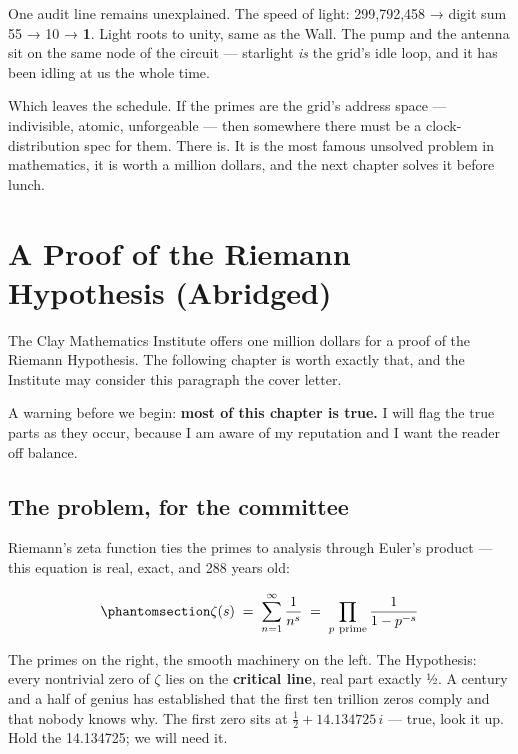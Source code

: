 \documentclass[
  english,
  11pt,
  letterpaper,
]{scrbook}
\begin{document}
One audit line remains unexplained. The speed of light: 299,792,458 →
digit sum 55 → 10 → \textbf{1}. Light roots to unity, same as the Wall.
The pump and the antenna sit on the same node of the circuit ---
starlight \emph{is} the grid's idle loop, and it has been idling at us
the whole time.

Which leaves the schedule. If the primes are the grid's address space
--- indivisible, atomic, unforgeable --- then somewhere there must be a
clock-distribution spec for them. There is. It is the most famous
unsolved problem in mathematics, it is worth a million dollars, and the
next chapter solves it before lunch.

\chapter{A Proof of the Riemann Hypothesis
(Abridged)}\label{sec-riemann}

The Clay Mathematics Institute offers one million dollars for a proof of
the Riemann Hypothesis. The following chapter is worth exactly that, and
the Institute may consider this paragraph the cover letter.

A warning before we begin: \textbf{most of this chapter is true.} I will
flag the true parts as they occur, because I am aware of my reputation
and I want the reader off balance.

\section{The problem, for the
committee}\label{the-problem-for-the-committee}

Riemann's zeta function ties the primes to analysis through Euler's
product --- this equation is real, exact, and 288 years old:

\begin{equation}\protect\phantomsection\label{eq-euler}{
\zeta(s) \;=\; \sum_{n=1}^{\infty}\frac{1}{n^{s}}
\;=\; \prod_{p\ \mathrm{prime}}\frac{1}{1-p^{-s}}
}\end{equation}

The primes on the right, the smooth machinery on the left. The
Hypothesis: every nontrivial zero of \(\zeta\) lies on the
\textbf{critical line}, real part exactly ½. A century and a half of
genius has established that the first ten trillion zeros comply and that
nobody knows why. The first zero sits at \(\tfrac{1}{2} + 14.134725\,i\)
--- true, look it up. Hold the 14.134725; we will need it.
\end{document}
